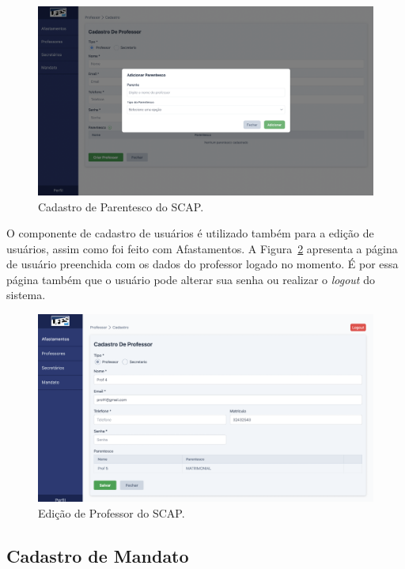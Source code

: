 \begin{figure}
    \centering
    \includegraphics[width=\textwidth]{figuras/prints-app/fig-modal-parentesco.png}
    \caption{Cadastro de Parentesco do SCAP.}
    \label{fig-parentesco}
\end{figure}


O componente de cadastro de usuários é utilizado também para a edição de usuários, assim como foi feito com Afastamentos. A Figura~\ref{fig-editar-professor}
apresenta a página de usuário preenchida com os dados do professor logado no momento. É por essa página também que o usuário pode alterar sua senha ou realizar o \textit{logout} do sistema.

\begin{figure}[h!]
    \centering
    \includegraphics[width=\textwidth]{figuras/prints-app/fig-perfil.png}
    \caption{Edição de Professor do SCAP.}
    \label{fig-editar-professor}
\end{figure}


\subsection{Cadastro de Mandato}
\label{subsec-projeto-cadastro-mandato}

